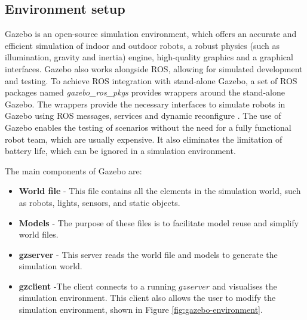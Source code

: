 \subsection{Environment setup}
\label{subsec:sim:environment_set_up}

Gazebo is an open-source simulation environment, which offers an accurate and efficient simulation of indoor and outdoor robots, a robust physics (such as illumination, gravity and inertia) engine, high-quality graphics and a graphical interfaces. Gazebo also works alongside ROS, allowing for simulated development and testing. To achieve ROS integration with stand-alone Gazebo, a set of ROS packages named \textit{gazebo\_ros\_pkgs} provides wrappers around the stand-alone Gazebo. The wrappers provide the necessary interfaces to simulate robots in Gazebo using ROS messages, services and dynamic reconfigure \cite{Quigley2009}. The use of Gazebo enables the testing of scenarios without the need for a fully functional robot team, which are usually expensive. It also eliminates the limitation of battery life, which can be ignored in a simulation environment.



The main components of Gazebo are:
\begin{itemize}
\item \textbf{World file} - This file contains all the elements in the simulation world, such as robots, lights, sensors, and static objects.
\item \textbf{Models} - The purpose of these files is to facilitate model reuse and simplify world files.
\item \textbf{gzserver} - This server reads the world file and models to generate the simulation world.
\item \textbf{gzclient} -The client connects to a running \(gzserver\) and visualises the simulation environment. This client also allows the user to modify the simulation environment, shown in Figure \ref{fig:gazebo-environment}.
\end{itemize}

